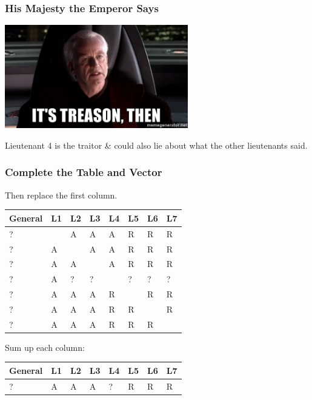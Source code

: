 \begin{frame}
\frametitle{His Majesty the Emperor Says}
\begin{center}
	\includegraphics[width=0.6\textwidth]{images/treason.jpg}
\end{center}

Lieutenant 4 is the traitor \& could also lie about what the other lieutenants said.

\end{frame}

\begin{frame}
\frametitle{Complete the Table and Vector}

Then replace the first column.

\begin{center}
\begin{tabular}{|l|l|l|l|l|l|l|l|}
\hline
General & L1 & L2 & L3 & L4 & L5 & L6 & L7 \\	
\hline
? & ~ & A & A & A & R & R & R \\ \hline
? & A & ~ & A & A & R & R & R \\ \hline
? & A & A & ~ & A & R & R & R \\ \hline
? & A & ? & ? & ~ & ? & ? & ? \\ \hline
? & A & A & A & R & ~ & R & R \\ \hline
? & A & A & A & R & R & ~ & R \\ \hline
? & A & A & A & R & R & R & ~ \\ \hline
\end{tabular}
\end{center}

Sum up each column:

\begin{center}
\begin{tabular}{|l|l|l|l|l|l|l|l|}
\hline
General & L1 & L2 & L3 & L4 & L5 & L6 & L7 \\	
\hline
? & A & A & A & ? & R & R & R \\
\hline
\end{tabular}
\end{center}

\end{frame}

